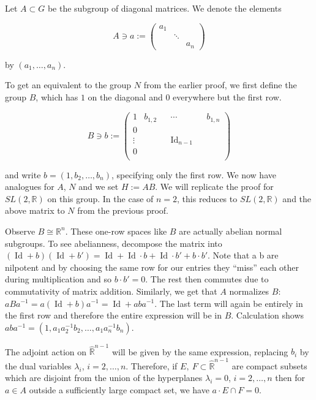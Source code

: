 \documentclass[
  12pt
]{article}
\theoremstyle{break}
\theoremstyle{plain}
\newcommand{\bbr}{\ensuremath{\mathbb{R}}\xspace}
\newcommand{\sltr}{\ensuremath{SL(2, \mathbb{R})}\xspace}
\DeclareMathOperator{\Id}{Id}
\begin{document}
  Let $A \subset G$ be the subgroup of diagonal matrices. We denote the elements

  $$
  A \ni a := \begin{pmatrix}
    a_1 & & \\
        & \ddots & \\
        & & a_n
  \end{pmatrix}
  $$

  by $(a_1, \dots, a_n)$.

  To get an equivalent to the group $N$ from the earlier proof, we first define the group $B$, which has $1$ on the diagonal and $0$ everywhere but the first row.

  $$
    B \ni b := \begin{pmatrix}
      1 & b_{1,2} & & \cdots & & b_{1,n} \\
      0 & & &  & \\
      \vdots & & & \Id_{n-1} & \\
      0 & & & & \\
    \end{pmatrix}
  $$

  and write $b = (1, b_2, \dots, b_n)$, specifying only the first row.
  We now have analogues for $A$, $N$ and we set $H:=AB$. We will replicate the proof for \sltr on this group.
  In the case of $n = 2$, this reduces to \sltr and the above matrix to $N$ from the previous proof.

  Observe $B \cong \bbr^n$.
  These one-row spaces like $B$ are actually abelian normal subgroups.
  To see abelianness, decompose the matrix into $(\Id + b)(\Id +b') = \Id + \Id\cdot b + \Id\cdot b' + b\cdot b'$.
  Note that a b are nilpotent and by choosing the same row for our entries they
  ``miss'' each other during multiplication and so $b\cdot b' =0$. The rest then commutes
  due to commutativity of matrix addition.
  Similarly, we get that $A$ normalizes $B$: $aBa^{-1} = a(\Id + b)a^{-1} = \Id + aba^{-1}$.
  The last term will again be entirely in the first row and therefore the entire expression will be in $B$.
  Calculation shows $aba^{-1} = (1, a_1a_2^{-1}b_2, \dots, a_1a_n^{-1}b_n)$.

  The adjoint action on $\hat{\bbr}^{n-1}$ will be given by the same expression,
  replacing $b_i$ by the dual variables $\lambda_i$, $i = 2, \dots , n$.
  Therefore, if $E,\ F \subset \hat{\bbr}^{n-1}$ are
  compact subsets which are disjoint from the union of the hyperplanes $\lambda_i = 0$,
  $i = 2, \dots , n$ then for $a\in A$ outside a sufficiently large compact set, we have
  $a\cdot E \cap F = 0$.
\end{document}
